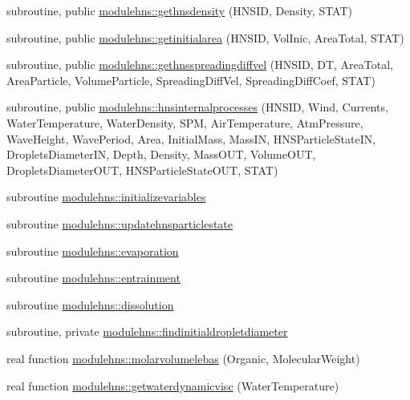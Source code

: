 \begin{DoxyCompactItemize}
\item 
subroutine, public \mbox{\hyperlink{namespacemodulehns_a4c50440c13ebd880d5f1b94bc868d428}{modulehns\+::gethnsdensity}} (H\+N\+S\+ID, Density, S\+T\+AT)
\item 
subroutine, public \mbox{\hyperlink{namespacemodulehns_aabe546b840bff5b9fd03aff072b67385}{modulehns\+::getinitialarea}} (H\+N\+S\+ID, Vol\+Inic, Area\+Total, S\+T\+AT)
\item 
subroutine, public \mbox{\hyperlink{namespacemodulehns_a13a7fa3be67224e60db06a75d7f0dea7}{modulehns\+::gethnsspreadingdiffvel}} (H\+N\+S\+ID, DT, Area\+Total, Area\+Particle, Volume\+Particle, Spreading\+Diff\+Vel, Spreading\+Diff\+Coef, S\+T\+AT)
\item 
subroutine, public \mbox{\hyperlink{namespacemodulehns_a6329952c484c367d1190fff3d5a0d951}{modulehns\+::hnsinternalprocesses}} (H\+N\+S\+ID, Wind, Currents, Water\+Temperature, Water\+Density, S\+PM, Air\+Temperature, Atm\+Pressure, Wave\+Height, Wave\+Period, Area, Initial\+Mass, Mass\+IN, H\+N\+S\+Particle\+State\+IN, Droplets\+Diameter\+IN, Depth, Density, Mass\+O\+UT, Volume\+O\+UT, Droplets\+Diameter\+O\+UT, H\+N\+S\+Particle\+State\+O\+UT, S\+T\+AT)
\item 
subroutine \mbox{\hyperlink{namespacemodulehns_a23256714b2ab17223f430aced19cdda8}{modulehns\+::initializevariables}}
\item 
subroutine \mbox{\hyperlink{namespacemodulehns_a4966ebd0f80ed38b932eafaa93d15db4}{modulehns\+::updatehnsparticlestate}}
\item 
subroutine \mbox{\hyperlink{namespacemodulehns_aea7fc4ad80f75c5e51fdf077a3c341c8}{modulehns\+::evaporation}}
\item 
subroutine \mbox{\hyperlink{namespacemodulehns_a13e99017fa3f908e775b29ff9c3fee14}{modulehns\+::entrainment}}
\item 
subroutine \mbox{\hyperlink{namespacemodulehns_a2b9b45c82fa5451490cda26d15845a31}{modulehns\+::dissolution}}
\item 
subroutine, private \mbox{\hyperlink{namespacemodulehns_a837429821cbc45e6eb9a1c1aad7bef4e}{modulehns\+::findinitialdropletdiameter}}
\item 
real function \mbox{\hyperlink{namespacemodulehns_a1d67c72bdca52544f6736edf0babb013}{modulehns\+::molarvolumelebas}} (Organic, Molecular\+Weight)
\item 
real function \mbox{\hyperlink{namespacemodulehns_a0b9d738b31afba3668603a21335882f9}{modulehns\+::getwaterdynamicvisc}} (Water\+Temperature)
\item 

\end{DoxyCompactItemize}

